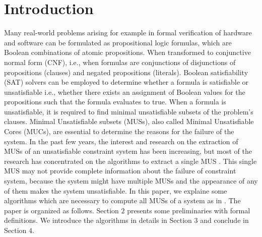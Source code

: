 \section{Introduction}
\label{sec:introduction}
Many real-world problems arising for example in formal verification of hardware and software can be formulated as propositional logic formulas, which are Boolean combinations of atomic propositions. When transformed to conjunctive normal form (CNF), i.e., when formulas are conjunctions of disjunctions of propositions (clauses) and negated propositions (literals). Boolean satisfiability (SAT) solvers can be employed to determine whether a formula is satisfiable or unsatisfiable i.e., whether there exists an assignment of Boolean values for the propositions such that the formula evaluates to true. When a formula is unsatisfiable, it is required to find minimal unsatisfiable subsets of the problem's clauses. Minimal Unsatisfiable subsets (MUSs), also called Minimal Unsatisfiable Cores (MUCs), are essential to determine the reasons for the failure of the system. In the past few years, the interest and research on the extraction of MUSs of an unsatisfiable constraint system has been increasing, but most of the research has concentrated on the algorithms to extract a single MUS \cite{karem}. This single MUS may not provide complete information about the failure of constraint system, because the system might have multiple MUSs and the appearance of any of them makes the system unsatisfiable.\newline
In this paper, we explaine some algorithms which are necessary to compute all MUSs of a system as in \cite{karem}. The paper is organized as follows. Section $2$ presents some preliminaries with formal definitions. We introduce the algorithms in details in Section $3$ and conclude in Section $4$.